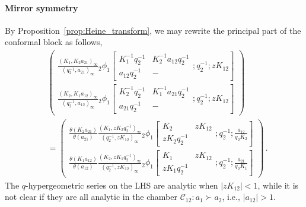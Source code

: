 \paragraph{Mirror symmetry}

By Proposition~\ref{prop:Heine_transform}, we may rewrite the principal part of the conformal block as follows, 
\begin{align}
    &
    \begin{pmatrix}
        \displaystyle \frac{(K_1,K_2 a_{21})_\infty}{(q_2^{-1},a_{21})_\infty} {_2\phi_1}\left[ 
    \begin{matrix}
        K_1^{-1}q_2^{-1} & K_2^{-1} a_{12} q_2^{-1} \\ a_{12} q_2^{-1} & -
    \end{matrix} ; q_2^{-1}; z K_{12} \right]
    \\[1.5em] \displaystyle
    \frac{(K_2,K_1 a_{12})_\infty}{(q_2^{-1},a_{12})_\infty} {_2\phi_1}\left[ 
    \begin{matrix}
        K_2^{-1}q_2^{-1} & K_1^{-1} a_{21} q_2^{-1} \\ a_{21} q_2^{-1} & -
    \end{matrix} ; q_2^{-1}; z K_{12} \right]
    \end{pmatrix} 
    \nonumber \\
    & =
    \begin{pmatrix}
        \displaystyle
        \frac{\theta(K_2 a_{21})}{\theta(a_{21})} \frac{(K_1,z K_2 q_2^{-1})_\infty}{(q_2^{-1},zK_{12})_\infty}
        {_2\phi_1} \left[
        \begin{matrix}
            K_2 & z K_{12} \\ z K_2 q_2^{-1}
        \end{matrix} ; q_2^{-1} ; \frac{a_{12}}{q_2 K_2}
        \right] \\[1.5em]
        \displaystyle
        \frac{\theta(K_1 a_{12})}{\theta(a_{12})} \frac{(K_2,z K_1 q_2^{-1})_\infty}{(q_2^{-1},zK_{12})_\infty}
        {_2\phi_1} \left[
        \begin{matrix}
            K_1 & z K_{12} \\ z K_1 q_2^{-1}
        \end{matrix} ; q_2^{-1} ; \frac{a_{21}}{q_2 K_1}
        \right]
    \end{pmatrix}
    \, .
\end{align}
The $q$-hypergeometric series on the LHS are analytic when $|z K_{12}| < 1$, while it is not clear if they are all analytic in the chamber ${\mathscr{C}_{12}}: a_1 \succ a_2$, i.e., $|a_{12}| > 1$.
